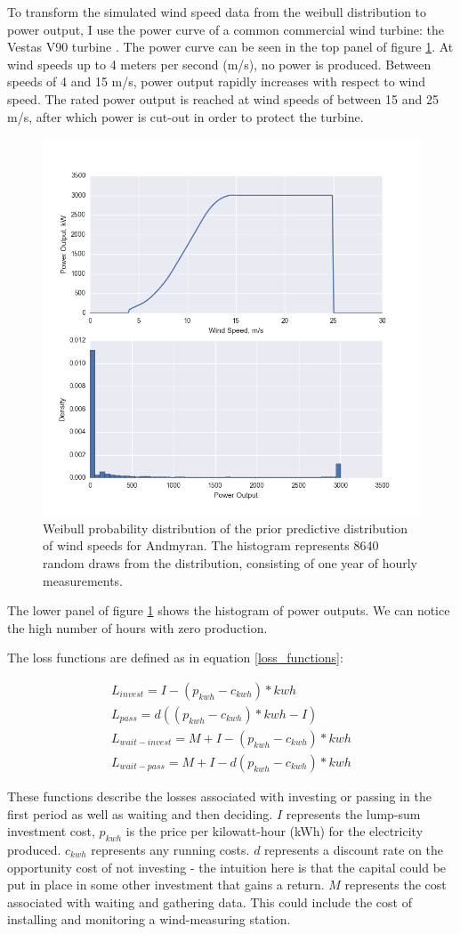 \documentclass[11pt]{article}
\begin{document}
To transform the simulated wind speed data from the weibull distribution to power output, I use the power curve of a common commercial wind turbine: the Vestas V90 turbine \citep{vestas_v90}. The power curve can be seen in the top panel of figure \ref{power_output}. At wind speeds up to 4 meters per second (m/s), no power is produced. Between speeds of 4 and 15 m/s, power output rapidly increases with respect to wind speed. The rated power output is reached at wind speeds of between 15 and 25 m/s, after which power is cut-out in order to protect the turbine. 

\begin{figure}
	\includegraphics[width=.6\textwidth]{figures/power_output.png}
	\caption{Weibull probability distribution of the prior predictive distribution of wind speeds for Andmyran. The histogram represents 8640 random draws from the distribution, consisting of one year of hourly measurements.}
	\label{power_output}
\end{figure}

The lower panel of figure \ref{power_output} shows the histogram of power outputs. We can notice the high number of hours with zero production.

The loss functions are defined as in equation \ref{loss_functions}:

\begin{align}
L_{invest} = I - (p_{kwh} - c_{kwh})*kwh\\
L_{pass} = d((p_{kwh} - c_{kwh})*kwh-I)\\
L_{wait-invest} = M + I - (p_{kwh} - c_{kwh})*kwh\\
L_{wait-pass} = M + I - d(p_{kwh} - c_{kwh})*kwh
\label{loss_functions}
\end{align}

These functions describe the losses associated with investing or passing in the first period as well as waiting and then deciding. $I$ represents the lump-sum investment cost, $p_{kwh}$ is the price per kilowatt-hour (kWh) for the electricity produced. $c_{kwh}$ represents any running costs. $d$ represents a discount rate on the opportunity cost of not investing - the intuition here is that the capital could be put in place in some other investment that gains a return. $M$ represents the cost associated with waiting and gathering data. This could include the cost of installing and monitoring a wind-measuring station.
\end{document}
